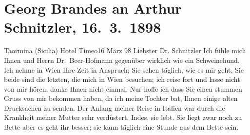 

               \section[Georg Brandes an Arthur Schnitzler, 16. 3. 1898]{ Georg Brandes an Arthur Schnitzler, 16. 3. 1898}\nopagebreak{}\rehead{ }\begin{ledgroupsized}[t]{13cm}\normalsize\beginnumbering{} \toendnotes[C]{\smallbreak\pagebreak[2]} 
\toendnotes[C]{\smallbreak}\pstart
           \raggedleft{}{\pb}Taormina (Sicilia) Hotel Timeo16 März 98\pend
           \pstart\center{}Liebster Dr. Schnitzler\pend\pstart
           Ich fühle mich Ihnen und Herrn Dr. Beer-Hofmann gegenüber wirklich wie ein Schweinehund. Ich nehme
                    in Wien Ihre Zeit in Anspruch; Sie sehen
                    täglich, wie es mir geht, Sie beide sind die letzten, die mich in Wien besuchen; ich reise fort und lasse nicht von
                    mir hören, danke Ihnen nicht einmal. Nur hoffe ich dass Sie einen stummen Gruss
                    von mir bekommen haben, da ich meine Tochter bat, Ihnen einige alten Drucksachen zu senden.\pend
           \pstart
           Der Anfang meiner Reise in Italien war durch die Krankheit meiner Mutter
               sehr {\pb}verdüstert. Indes, sie lebt. Sie liegt zwar noch zu Bette aber es geht ihr
                    besser; sie kann täglich eine Stunde aus dem Bette sein.\pend

\end{ledgroupsized}
